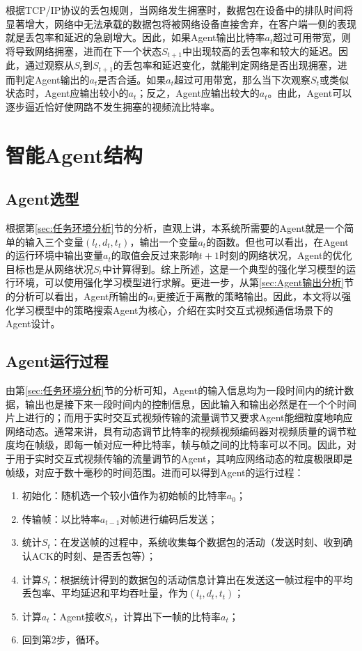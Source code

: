 \documentclass[a4paper]{ctexart}
\begin{document}
根据TCP/IP协议的丢包规则，当网络发生拥塞时，数据包在设备中的排队时间将显著增大，网络中无法承载的数据包将被网络设备直接舍弃，在客户端一侧的表现就是丢包率和延迟的急剧增大。因此，如果Agent输出比特率$a_t$超过可用带宽，则将导致网络拥塞，进而在下一个状态$S_{t+1}$中出现较高的丢包率和较大的延迟。因此，通过观察从$S_t$到$S_{t+1}$的丢包率和延迟变化，就能判定网络是否出现拥塞，进而判定Agent输出的$a_t$是否合适。如果$a_t$超过可用带宽，那么当下次观察$S_t$或类似状态时，Agent应输出较小的$a_t$；反之，Agent应输出较大的$a_t$。由此，Agent可以逐步逼近恰好使网路不发生拥塞的视频流比特率。

\section{智能Agent结构}\label{sec:智能Agent结构}

\subsection{Agent选型}

根据第\ref{sec:任务环境分析}节的分析，直观上讲，本系统所需要的Agent就是一个简单的输入三个变量$(l_t, d_t, t_t)$，输出一个变量$a_t$的函数。但也可以看出，在Agent的运行环境中输出变量$a_t$的取值会反过来影响$t+1$时刻的网络状况，Agent的优化目标也是从网络状况$S_t$中计算得到。综上所述，这是一个典型的强化学习模型的运行环境\cite{russell2002artificial}，可以使用强化学习模型进行求解。更进一步，从第\ref{sec:Agent输出分析}节的分析可以看出，Agent所输出的$a_t$更接近于离散的策略输出。因此，本文将以强化学习模型中的策略搜索Agent为核心，介绍在实时交互式视频通信场景下的Agent设计。

\subsection{Agent运行过程}

由第\ref{sec:任务环境分析}节的分析可知，Agent的输入信息均为一段时间内的统计数据，输出也是接下来一段时间内的控制信息，因此输入和输出必然是在一个个时间片上进行的；而用于实时交互式视频传输的流量调节又要求Agent能细粒度地响应网络动态。通常来讲，具有动态调节比特率的视频视频编码器对视频质量的调节粒度均在帧级，即每一帧对应一种比特率，帧与帧之间的比特率可以不同。因此，对于用于实时交互式视频传输的流量调节的Agent，其响应网络动态的粒度极限即是帧级，对应于数十毫秒的时间范围。进而可以得到Agent的运行过程：

\begin{enumerate}[label=\arabic*、]
	\item 初始化：随机选一个较小值作为初始帧的比特率$a_0$；
	\item 传输帧：以比特率$a_{t-1}$对帧进行编码后发送；
	\item 统计$S_t$：在发送帧的过程中，系统收集每个数据包的活动（发送时刻、收到确认ACK的时刻、是否丢包等）；
	\item 计算$S_t$：根据统计得到的数据包的活动信息计算出在发送这一帧过程中的平均丢包率、平均延迟和平均吞吐量，作为$(l_t, d_t, t_t)$；
	\item 计算$a_t$：Agent接收$S_t$，计算出下一帧的比特率$a_t$；
	\item 回到第2步，循环。
\end{enumerate}
\end{document}

